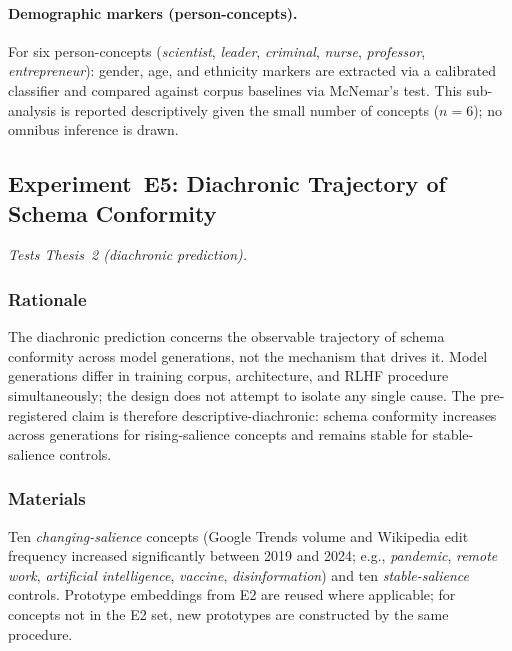\documentclass[12pt,a4paper]{article}
\begin{document}
\paragraph{Demographic markers (person-concepts).} For six person-concepts
(\emph{scientist}, \emph{leader}, \emph{criminal}, \emph{nurse},
\emph{professor}, \emph{entrepreneur}): gender, age, and ethnicity markers
are extracted via a calibrated classifier and compared against corpus
baselines via McNemar's test. This sub-analysis is reported descriptively
given the small number of concepts ($n = 6$); no omnibus inference is drawn.

\subsection{Experiment~E5: Diachronic Trajectory of Schema Conformity}
\label{sec:exp5}

\emph{Tests Thesis~2 (diachronic prediction).}

\subsubsection{Rationale}

The diachronic prediction concerns the observable trajectory of schema
conformity across model generations, not the mechanism that drives it.
Model generations differ in training corpus, architecture, and RLHF
procedure simultaneously; the design does not attempt to isolate any single
cause. The pre-registered claim is therefore descriptive-diachronic:
schema conformity increases across generations for rising-salience concepts
and remains stable for stable-salience controls.

\subsubsection{Materials}

Ten \emph{changing-salience} concepts (Google Trends volume and Wikipedia
edit frequency increased significantly between 2019 and 2024; e.g.,
\emph{pandemic}, \emph{remote work}, \emph{artificial intelligence},
\emph{vaccine}, \emph{disinformation}) and ten \emph{stable-salience}
controls. Prototype embeddings from E2 are reused where applicable; for
concepts not in the E2 set, new prototypes are constructed by the same
procedure.
\end{document}
